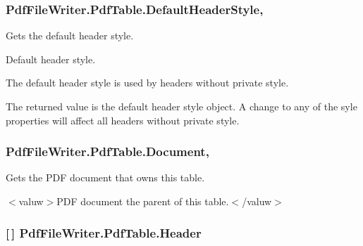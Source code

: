 \subsubsection[{\texorpdfstring{Default\+Header\+Style}{DefaultHeaderStyle}}]{ Pdf\+File\+Writer.\+Pdf\+Table.\+Default\+Header\+Style\hspace{0.3cm}{\ttfamily [get]}, {\ttfamily [set]}}\hypertarget{class_pdf_file_writer_1_1_pdf_table_ac13226d28d2842c99eb5674724edc48b}{}\label{class_pdf_file_writer_1_1_pdf_table_ac13226d28d2842c99eb5674724edc48b}


Gets the default header style. 

Default header style.

The default header style is used by headers without private style. 

The returned value is the default header style object. A change to any of the syle properties will affect all headers without private style. 
\subsubsection[{\texorpdfstring{Document}{Document}}]{ Pdf\+File\+Writer.\+Pdf\+Table.\+Document\hspace{0.3cm}{\ttfamily [get]}, {\ttfamily [set]}}\hypertarget{class_pdf_file_writer_1_1_pdf_table_a69e0b368de484686e90d1902295ca265}{}\label{class_pdf_file_writer_1_1_pdf_table_a69e0b368de484686e90d1902295ca265}


Gets the P\+DF document that owns this table. 

$<$valuw$>$P\+DF document the parent of this table.$<$/valuw$>$ 
\subsubsection[{\texorpdfstring{Header}{Header}}]{ \mbox{[}$\,$\mbox{]} Pdf\+File\+Writer.\+Pdf\+Table.\+Header\hspace{0.3cm}{\ttfamily [get]}}\hypertarget{class_pdf_file_writer_1_1_pdf_table_a347bc6a7b63b21c8c08b1b6c1523079f}{}\label{class_pdf_file_writer_1_1_pdf_table_a347bc6a7b63b21c8c08b1b6c1523079f}


